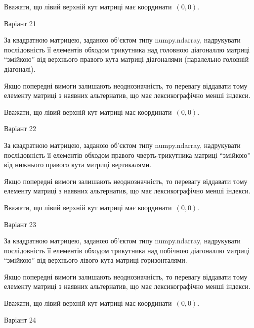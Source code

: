 \documentclass[11pt]{article}
\begin{document}
Вважати, що лівий верхній кут матриці має координати~$(0,0)$.



{\Large \center  Варіант  21\par \bigskip\bigskip}

За квадратною матрицею, заданою об'єктом типу numpy.ndarray, надрукувати послідовність її елементів обходом трикутника над головною діагоналлю матриці ``змійкою'' від верхнього правого кута матриці діагоналями (паралельно головній діагоналі).

\vspace{2mm}
Якщо попередні вимоги залишають неоднозначність, то перевагу віддавати тому елементу матриці з наявних альтернатив, що має лексикографічно менші індекси.

Вважати, що лівий верхній кут матриці має координати~$(0,0)$.



{\Large \center  Варіант  22\par \bigskip\bigskip}

За квадратною матрицею, заданою об'єктом типу numpy.ndarray, надрукувати послідовність її елементів обходом правого чверть-трикутника матриці ``змійкою'' від нижнього правого кута матриці вертикалями.

\vspace{2mm}
Якщо попередні вимоги залишають неоднозначність, то перевагу віддавати тому елементу матриці з наявних альтернатив, що має лексикографічно менші індекси.

Вважати, що лівий верхній кут матриці має координати~$(0,0)$.



{\Large \center  Варіант  23\par \bigskip\bigskip}

За квадратною матрицею, заданою об'єктом типу numpy.ndarray, надрукувати послідовність її елементів обходом трикутника над побічною діагоналлю матриці ``змійкою'' від верхнього лівого кута матриці горизонталями.

\vspace{2mm}
Якщо попередні вимоги залишають неоднозначність, то перевагу віддавати тому елементу матриці з наявних альтернатив, що має лексикографічно менші індекси.

Вважати, що лівий верхній кут матриці має координати~$(0,0)$.



{\Large \center  Варіант  24\par \bigskip\bigskip}
\end{document}
